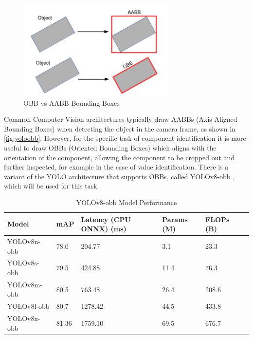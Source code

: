\begin{figure}[H]
    \begin{minipage}[h]{\textwidth}
        \centering
        \includegraphics[height=5cm]{imgs/software/yoloobb.png}
        \caption{OBB vs AABB Bounding Boxes \cite{aabbphoto}}
        \label{fig:yoloobb}
    \end{minipage}
\end{figure}

Common Computer Vision architectures typically draw AABBs (Axis Aligned Bounding Boxes) when detecting the object in the camera frame, as shown in \autoref{fig:yoloobb}. However, for the specific task of component identification it is more useful to draw OBBs (Oriented Bounding Boxes) which aligns with the orientation of the component, allowing the component to be cropped out and further inspected, for example in the case of value identification. There is a variant of the YOLO architecture that supports OBBs, called YOLOv8-obb \cite{yolov8}, which will be used for this task. 

\begin{table}[H]
    \centering
    {\fontsize{10pt}{12pt}\selectfont
    \begin{tabular}{|l|l|l|l|l|l|}
        \hline
        \textbf{Model} & \textbf{mAP\raisebox{-1pt}{\textsuperscript{50}}} & \textbf{Latency (CPU ONNX) (ms)} & \textbf{Params (M)} & \textbf{FLOPs (B)} \\
        \hline
        YOLOv8n-obb & 78.0 & 204.77 & 3.1 & 23.3 \\
        \hline
        YOLOv8s-obb & 79.5 & 424.88 & 11.4 & 76.3 \\
        \hline
        YOLOv8m-obb & 80.5 & 763.48 & 26.4 & 208.6 \\
        \hline
        YOLOv8l-obb & 80.7 & 1278.42 & 44.5 & 433.8 \\
        \hline
        YOLOv8x-obb & 81.36 & 1759.10 & 69.5 & 676.7 \\
        \hline
    \end{tabular}
    }
    \caption{YOLOv8-obb Model Performance \cite{yolov8}}
    \label{tab:yoloperformanceobb}
\end{table}

